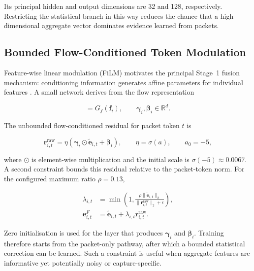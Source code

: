 \documentclass[11pt,fleqn]{report}
\begin{document}
Its principal hidden and output dimensions are 32 and 128, respectively. Restricting the statistical branch in this way reduces the chance that a high-dimensional aggregate vector dominates evidence learned from packets.

\subsection{Bounded Flow-Conditioned Token Modulation}
\label{subsubsec:token_film}

Feature-wise linear modulation (FiLM) motivates the principal Stage~1 fusion mechanism: conditioning information generates affine parameters for individual features \cite{Perez2018FiLM}. A small network derives from the flow representation

\begin{equation}
    [\boldsymbol{\gamma}_i;\boldsymbol{\beta}_i]
    =G_f(\mathbf{f}_i),
    \qquad
    \boldsymbol{\gamma}_i,\boldsymbol{\beta}_i\in\mathbb{R}^{d}.
    \label{eq:film_parameters}
\end{equation}

The unbounded flow-conditioned residual for packet token $t$ is

\begin{equation}
    \mathbf{r}^{\mathrm{raw}}_{i,t}
    =\eta
    \left(
        \boldsymbol{\gamma}_i\odot\widetilde{\mathbf{e}}_{i,t}
        +\boldsymbol{\beta}_i
    \right),
    \qquad
    \eta=\sigma(a),\qquad a_{0}=-5,
    \label{eq:film_raw_residual}
\end{equation}

where $\odot$ is element-wise multiplication and the initial scale is $\sigma(-5)\approx0.0067$. A second constraint bounds this residual relative to the packet-token norm. For the configured maximum ratio $\rho=0.13$,

\begin{align}
    \lambda_{i,t}
    &=\min\left(
        1,
        \frac{\rho\|\widetilde{\mathbf{e}}_{i,t}\|_2}
             {\|\mathbf{r}^{\mathrm{raw}}_{i,t}\|_2+\epsilon}
      \right),\\
    \mathbf{e}^{F}_{i,t}
    &=\widetilde{\mathbf{e}}_{i,t}
      +\lambda_{i,t}\mathbf{r}^{\mathrm{raw}}_{i,t}.
    \label{eq:bounded_token_film}
\end{align}

Zero initialisation is used for the layer that produces $\boldsymbol{\gamma}_i$ and $\boldsymbol{\beta}_i$. Training therefore starts from the packet-only pathway, after which a bounded statistical correction can be learned. Such a constraint is useful when aggregate features are informative yet potentially noisy or capture-specific.
\end{document}
